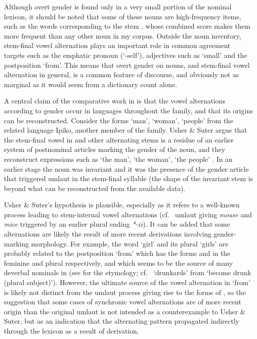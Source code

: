 \documentclass[output=collectionpaper]{langsci/langscibook}
\begin{document}
Although overt gender is found only in a very small portion of the nominal lexicon, it should be noted that some of these nouns are high-frequency items, such as the words corresponding to the stem , whose combined score makes them more frequent than any other noun in my corpus. Outside the noun inventory, stem-final vowel alternation plays an important role in common agreement targets such as the emphatic pronoun  (`-self'), adjectives such as  `small' and the postposition  `from'. This means that overt gender on nouns, and stem-final vowel alternation in general, is a common feature of  discourse, and obviously not as marginal as it would seem from a dictionary count alone.

A central claim of the comparative work in \textcite{Usher2015} is that the vowel alternations according to gender occur in languages throughout the  family, and that its origins can be reconstructed. Consider the forms  `man',  `woman',  `people' from the related language Ipiko, another member of the  family. Usher \& Suter argue that the stem-final vowel in  and other alternating stems is a residue of an earlier system of postnominal articles marking the gender of the noun, and they reconstruct expressions such as  `the man',  `the woman',  `the people' \parencite*[114]{Usher2015}. In an earlier stage the noun was invariant and it was the presence of the gender article that triggered umlaut in the stem-final syllable (the shape of the invariant stem is beyond what can be reconstructed from the available data).

Usher \& Suter's hypothesis is plausible, especially as it refers to a well-known process leading to stem-internal vowel alternations (cf.\  umlaut giving  \emph{mouse} and \emph{mice} triggered by an earlier plural ending \emph{*-iz}). It can be added that some alternations are likely the result of more recent derivations involving gender-marking morphology. For example, the word  `girl' and its plural  `girls' are probably related to the postposition `from' which has the forms  and  in the feminine and plural respectively, and which seems to be the source of many deverbal nominals in  (see \citealt[335]{Geurtjens1933} for the etymology; cf.\  `drunkards' from  `become drunk (plural subject)'). However, the ultimate source of the vowel alternation in  `from' is likely not distinct from the umlaut process giving rise to the forms of , so the suggestion that some cases of synchronic vowel alternations are of more recent origin than the original umlaut is not intended as a counterexample to Usher \& Suter, but as an indication that the alternating pattern propagated indirectly through the lexicon as a result of derivation.
\end{document}
